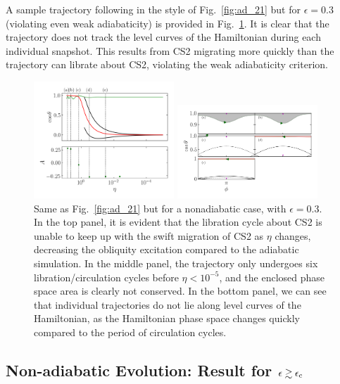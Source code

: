 A sample trajectory following in the style of Fig.~\ref{fig:ad_21} but for
$\epsilon = 0.3$ (violating even weak adiabaticity) is provided in
Fig.~\ref{fig:nonad_traj}. It is clear that the trajectory does not track the
level curves of the Hamiltonian during each individual snapshot. This results
from CS2 migrating more quickly than the trajectory can librate about CS2,
violating the weak adiabaticity criterion.
\begin{figure}
    \centering
    \includegraphics[width=0.47\textwidth]{plots_diskdisp/3testo_nonad.png}

    \includegraphics[width=0.47\textwidth]{plots_diskdisp/3testo_nonad_subplots.png}
    \caption{Same as Fig.~\ref{fig:ad_21} but for a nonadiabatic case, with $\epsilon =
    0.3$. In the top panel, it is evident that the libration cycle about CS2 is
    unable to keep up with the swift migration of CS2 as $\eta$ changes,
    decreasing the obliquity excitation compared to the adiabatic simulation. In
    the middle panel, the trajectory only undergoes six libration/circulation
    cycles before $\eta < 10^{-5}$, and the enclosed phase space area is
    clearly not conserved. In the bottom panel, we can see that individual
    trajectories do not lie along level curves of the Hamiltonian, as the
    Hamiltonian phase space changes quickly compared to the period of
    circulation cycles.}\label{fig:nonad_traj}
\end{figure}

\subsection{Non-adiabatic Evolution:
Result for $\epsilon\gtrsim \epsilon_{\rm c}$}

